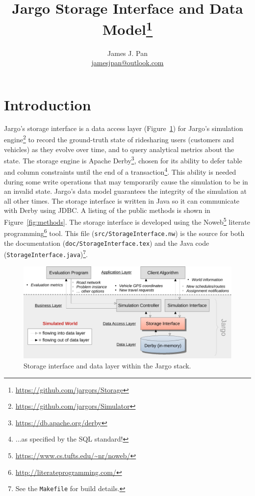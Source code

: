 \documentclass{article}
\title{Jargo Storage Interface
  and Data Model\footnote{\url{https://github.com/jargors/Storage}}}
\author{James J. Pan\\
  \small{\href{mailto:jamesjpan@outlook.com}{jamesjpan@outlook.com}}
}
\theoremstyle{definition}
\begin{document}
\maketitle
\pagestyle{noweb}

\tableofcontents

\section{Introduction}
\label{sec:introduction}
Jargo's storage interface is a data access layer (Figure~\ref{fig:storage}) for
Jargo's simulation engine\footnote{\url{https://github.com/jargors/Simulator}}
to record the ground-truth state of ridesharing users (customers and vehicles)
as they evolve over time, and to query analytical metrics about the state.  The
storage engine is Apache Derby\footnote{\url{https://db.apache.org/derby}},
chosen for its ability to defer table and column constraints until the end of a
transaction\footnote{...as specified by the SQL standard!}.  This ability is
needed during some write operations that may temporarily cause the simulation
to be in an invalid state. Jargo's data model guarantees the integrity of the
simulation at all other times. The storage interface is written in Java so it
can communicate with Derby using JDBC. A listing of the public methods is
shown in Figure~\ref{fig:methods}.
The storage interface is developed using the
Noweb\footnote{\url{https://www.cs.tufts.edu/~nr/noweb/}} literate
programming\footnote{\url{http://literateprogramming.com/}} tool.  This file
({\tt{}src/StorageInterface.nw}) is the source for both the documentation
({\tt{}doc/StorageInterface.tex}) and the Java code ({\tt{}StorageInterface.java})\footnote{See the
{\tt{}Makefile} for build details.}.

\begin{figure}[h]
\centering
\includegraphics[width=150mm]{src/fig/storage-fig}
\caption{Storage interface and data layer within the Jargo stack.}
\label{fig:storage}
\end{figure}
\end{document}
